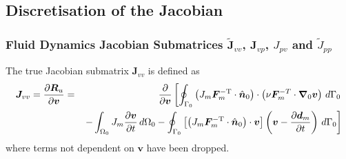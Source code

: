 \documentclass[sn-mathphys,Numbered]{sn-jnl}%
\newcommand{\bb}{\boldsymbol}
\begin{document}
\subsection{Discretisation of the Jacobian}

\subsubsection[Fluid Dynamics Jacobian Submatrices]{Fluid Dynamics Jacobian Submatrices $\tilde{\bb{J}}_{vv}$, $\bb{J}_{vp}$, $J_{pv}$ and $\tilde{J}_{pp}$}

The true Jacobian submatrix $\bb{J}_{vv}$ is defined as
\begin{eqnarray}
    \bb{J}_{vv} = \frac{\partial \bb{R}_u}{\partial \bb{v}}
    &=&
    	\frac{\partial}{\partial \bb{v}}
	\left[
	\oint_{\Gamma_0}  \left( J_m \bb{F}_m^{-\text{T}} \cdot \hat{\bb{n}}_0 \right)
		\cdot \left(\nu \bb{F}_m^{-T} \cdot \bb{\nabla}_0 \bb{v} \right) \, d\Gamma_0
	\right. \notag \\
	&& \left. 
	- \int_{\Omega_0} J_m \frac{\partial \bb{v}}{\partial t} \, d\Omega_0 
	- \oint_{\Gamma_0}  \left[ \left( J_m \bb{F}_m^{-\text{T}} \cdot \hat{\bb{n}}_0 \right) \cdot \bb{v} \right] \left(\bb{v} - \frac{\partial \bb{d}_m}{\partial t} \right) \, d\Gamma_0
	\right]
\end{eqnarray}
where terms not dependent on $\bb{v}$ have been dropped.
\end{document}
